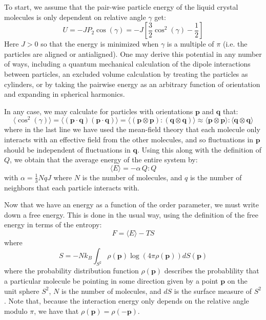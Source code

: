 \documentclass[reqno]{article}
\begin{document}
  To start, we assume that the pair-wise particle energy of the liquid crystal
  molecules is only dependent on relative angle $\gamma$ get:
  \begin{equation} \label{eq:maier-saupe-pairwise}
    U = -J P_2 \cos(\gamma) = -J \left[ \frac32 \cos^2(\gamma) - \frac12 \right]
  \end{equation}
  Here $J > 0$ so that the energy is minimized when $\gamma$ is a multiple of
  $\pi$ (i.e. the particles are aligned or antialigned).
  One may derive this potential in any number of ways, including a quantum
  mechanical calculation of the dipole interactions between particles, an
  excluded volume calculation by treating the particles as cylinders, or by
  taking the pairwise energy as an arbitrary function of orientation and
  expanding in spherical harmonics.

  In any case, we may calculate for particles with orientations $\mathbf{p}$ and
  $\mathbf{q}$ that:
  \begin{equation}
    \langle \cos^2(\gamma) \rangle
    =
    \langle (\mathbf{p}\cdot \mathbf{q}) (\mathbf{p} \cdot \mathbf{q}) \rangle
    =
    \langle (\mathbf{p} \otimes \mathbf{p}) : (\mathbf{q} \otimes \mathbf{q}) \rangle
    \approx
    \langle \mathbf{p} \otimes \mathbf{p} \rangle : \langle \mathbf{q} \otimes \mathbf{q} \rangle
  \end{equation}
  where in the last line we have used the mean-field theory that each molecule
  only interacts with an effective field from the other molecules, and so
  fluctuations in $\mathbf{p}$ should be independent of fluctuations in
  $\mathbf{q}$.
  Using this along with the definition of $Q$, we obtain that the average
  energy of the entire system by:
  \begin{equation}
    \langle E \rangle
    =
    -\alpha \, Q : Q
  \end{equation}
  with $\alpha = \frac13 N q J$ where $N$ is the number of molecules, and $q$ is
  the number of neighbors that each particle interacts with.

  Now that we have an energy as a function of the order parameter, we must write
  down a free energy.
  This is done in the usual way, using the definition of the free energy in
  terms of the entropy:
  \begin{equation} \label{eq:standard-free-energy}
    F = \langle E \rangle - TS
  \end{equation}
  where
  \begin{equation}
    S
    =
    -N k_B \int_{S^2} \rho(\mathbf{p}) \log \left( 4 \pi \rho(\mathbf{p})\right) dS (\mathbf{p})
  \end{equation}
  where the probability distribution function $\rho(\mathbf{p})$ describes the probablility
  that a particular molecule be pointing in some direction given by a point $\mathbf{p}$ on
  the unit sphere $S^2$, $N$ is the number of molecules, and $dS$ is
  the surface measure of $S^2$.
  Note that, because the interaction energy only depends on the relative angle
  modulo $\pi$, we have that $\rho(\mathbf{p}) = \rho(-\mathbf{p})$.
\end{document}
